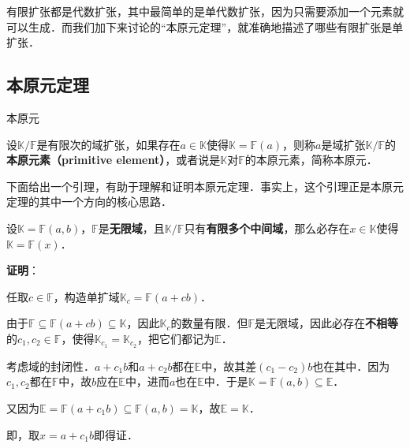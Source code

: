 


有限扩张都是代数扩张，其中最简单的是单代数扩张，因为只需要添加一个元素就可以生成．而我们加下来讨论的“本原元定理”，就准确地描述了哪些有限扩张是单扩张．

\subsection{本原元定理}

\begin{definition}{本原元}

设$\mathbb{K}/\mathbb{F}$是有限次的域扩张，如果存在$a\in\mathbb{K}$使得$\mathbb{K}=\mathbb{F}(a)$，则称$a$是域扩张$\mathbb{K}/\mathbb{F}$的\textbf{本原元素（primitive element）}，或者说是$\mathbb{K}$对$\mathbb{F}$的本原元素，简称本原元．

\end{definition}

下面给出一个引理，有助于理解和证明本原元定理．事实上，这个引理正是本原元定理的其中一个方向的核心思路．


\begin{lemma}{}\label{PrmtEl_lem1}
设$\mathbb{K}=\mathbb{F}(a, b)$，$\mathbb{F}$是\textbf{无限域}，且$\mathbb{K}/\mathbb{F}$只有\textbf{有限多个中间域}，那么必存在$x\in\mathbb{K}$使得$\mathbb{K}=\mathbb{F}(x)$．
\end{lemma}

\textbf{证明}：

任取$c\in\mathbb{F}$，构造单扩域$\mathbb{K}_c=\mathbb{F}(a+cb)$．

由于$\mathbb{F}\subseteq\mathbb{F}(a+cb)\subseteq\mathbb{K}$，因此$\mathbb{K}_c$的数量有限．但$\mathbb{F}$是无限域，因此必存在\textbf{不相等}的$c_1, c_2\in\mathbb{F}$，使得$\mathbb{K}_{c_1}=\mathbb{K}_{c_2}$，把它们都记为$\mathbb{E}$．

考虑域的封闭性．$a+c_1b$和$a+c_2b$都在$\mathbb{E}$中，故其差$(c_1-c_2)b$也在其中．因为$c_1, c_2$都在$\mathbb{F}$中，故$b$应在$\mathbb{E}$中，进而$a$也在$\mathbb{E}$中．于是$\mathbb{K}=\mathbb{F}(a, b)\subseteq\mathbb{E}$．

又因为$\mathbb{E}=\mathbb{F}(a+c_1b)\subseteq\mathbb{F}(a, b)=\mathbb{K}$，故$\mathbb{E}=\mathbb{K}$．

即，取$x=a+c_1b$即得证．



